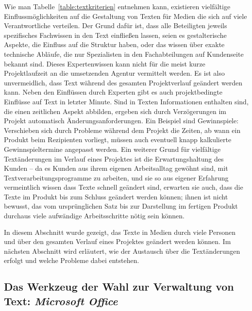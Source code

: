Wie man Tabelle~\ref{table:textkriterien} entnehmen kann, existieren vielfältige Einflussmöglichkeiten auf die Gestaltung von Texten für Medien die sich auf viele Verantwortliche verteilen. Der Grund dafür ist, dass alle Beteiligten jeweils spezifisches Fachwissen in den Text einfließen lassen, seien es gestalterische Aspekte, die Einfluss auf die Struktur haben, oder das wissen über exakte technische Abläufe, die nur Spezialisten in den Fachabteilungen auf Kundenseite bekannt sind. Dieses Expertenwissen kann nicht für die meist kurze Projektlaufzeit an die umsetzenden Agentur vermittelt werden. Es ist also unvermeidlich, dass Text während des gesamten Projektverlauf geändert werden kann. Neben den Einflüssen durch Experten gibt es auch projektbedingte Einflüsse auf Text in letzter Minute. Sind in Texten Informationen enthalten sind, die einen zeitlichen Aspekt abbilden, ergeben sich durch Verzögerungen im Projekt automatisch Änderungsanforderungen. Ein Beispiel sind Gewinnspiele: Verschieben sich durch Probleme während dem Projekt die Zeiten, ab wann ein Produkt beim Rezipienten vorliegt, müssen auch eventuell knapp kalkulierte Gewinnspieltermine angepasst werden. Ein weiterer Grund für vielfältige Textänderungen im Verlauf eines Projektes ist die Erwartungshaltung des Kunden -- da es Kunden aus ihrem eigenen Arbeitsalltag gewöhnt sind, mit Textverarbeitungsprogramme zu arbeiten, und sie so aus eigener Erfahrung vermeintlich wissen dass Texte schnell geändert sind, erwarten sie auch, dass die Texte im Produkt bis zum Schluss geändert werden können; ihnen ist nicht bewusst, das vom ursprünglichen Satz bis zur Darstellung im fertigen Produkt durchaus viele aufwändige Arbeitsschritte nötig sein können.

\bigskip

In diesem Abschnitt wurde gezeigt, das Texte in Medien durch viele Personen und über den gesamten Verlauf eines Projektes geändert werden können. Im nächsten Abschnitt wird erläutert, wie der Austausch über die Textänderungen erfolgt und welche Probleme dabei entstehen.


\subsection{Das Werkzeug der Wahl zur Verwaltung von Text: \emph{Microsoft Office}}

